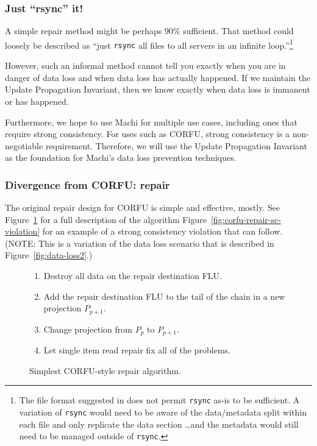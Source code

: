 \documentclass[preprint,10pt]{sigplanconf}
\begin{document}
\subsubsection{Just ``rsync'' it!}
\label{ssec:just-rsync-it}

A simple repair method might be perhaps 90\% sufficient.
That method could loosely be described as ``just {\tt rsync}
all files to all servers in an infinite loop.''\footnote{The
  file format suggested in
  \cite{machi-design} does not permit {\tt rsync}
  as-is to be sufficient.  A variation of {\tt rsync} would need to be
  aware of the data/metadata split within each file and only replicate
  the data section \ldots and the metadata would still need to be
  managed outside of {\tt rsync}.}

However, such an informal method
cannot tell you exactly when you are in danger of data loss and when
data loss has actually happened.  If we maintain the Update
Propagation Invariant, then we know exactly when data loss is immanent
or has happened.

Furthermore, we hope to use Machi for multiple use cases, including
ones that require strong consistency.
For uses such as CORFU, strong consistency is a non-negotiable
requirement.  Therefore, we will use the Update Propagation Invariant
as the foundation for Machi's data loss prevention techniques.

\subsubsection{Divergence from CORFU: repair}
\label{sub:repair-divergence}

The original repair design for CORFU is simple and effective,
mostly.  See Figure~\ref{fig:corfu-style-repair} for a full
description of the algorithm
Figure~\ref{fig:corfu-repair-sc-violation} for an example of a strong
consistency violation that can follow.  (NOTE: This is a variation of
the data loss scenario that is described in
Figure~\ref{fig:data-loss2}.)

\begin{figure}
\begin{enumerate}
\item Destroy all data on the repair destination FLU.
\item Add the repair destination FLU to the tail of the chain in a new
  projection $P_{p+1}$.
\item Change projection from $P_p$ to $P_{p+1}$.
\item Let single item read repair fix all of the problems.
\end{enumerate}
\caption{Simplest CORFU-style repair algorithm.}
\label{fig:corfu-style-repair}
\end{figure}
\end{document}
